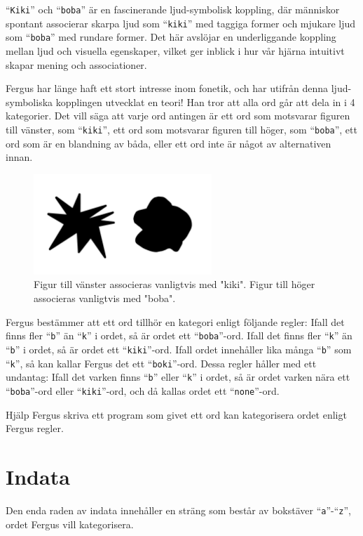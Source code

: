 \noindent
``\texttt{Kiki}'' och ``\texttt{boba}'' är en fascinerande ljud-symbolisk koppling, där människor spontant associerar skarpa ljud som ``\texttt{kiki}'' med taggiga former
och mjukare ljud som ``\texttt{boba}'' med rundare former. Det här avslöjar en underliggande koppling mellan ljud och visuella egenskaper, vilket ger inblick i hur
vår hjärna intuitivt skapar mening och associationer.

Fergus har länge haft ett stort intresse inom fonetik, och har utifrån denna ljud-symboliska kopplingen utvecklat en teori!
Han tror att alla ord går att dela in i 4 kategorier. Det vill säga att varje ord antingen är 
ett ord som motsvarar figuren till vänster, som ``\texttt{kiki}'', ett ord som motsvarar figuren till höger, som ``\texttt{boba}'', 
ett ord som är en blandning av båda, eller ett ord inte är något av alternativen innan.

\begin{figure}[h]
  \centering
\includegraphics[width=0.6\textwidth]{kikiboba.png}
  \caption{Figur till vänster associeras vanligtvis med "kiki". Figur till höger associeras vanligtvis med "boba".}
  \label{fig:kikiboba}
\end{figure}

Fergus bestämmer att ett ord tillhör en kategori enligt följande regler:
Ifall det finns fler ``\texttt{b}'' än ``\texttt{k}'' i ordet, så är ordet ett ``\texttt{boba}''-ord.
Ifall det finns fler ``\texttt{k}'' än ``\texttt{b}'' i ordet, så är ordet ett ``\texttt{kiki}''-ord. 
Ifall ordet innehåller lika många ``\texttt{b}'' som ``\texttt{k}'', så kan kallar Fergus det ett ``\texttt{boki}''-ord.
Dessa regler håller med ett undantag: 
Ifall det varken finns ``\texttt{b}'' eller ``\texttt{k}'' i ordet, så är ordet varken nära ett ``\texttt{boba}''-ord eller ``\texttt{kiki}''-ord, och då kallas ordet ett ``\texttt{none}''-ord.

Hjälp Fergus skriva ett program som givet ett ord kan kategorisera ordet enligt Fergus regler.

\section*{Indata}
Den enda raden av indata innehåller en sträng som består av bokstäver ``\texttt{a}''-``\texttt{z}'', ordet Fergus vill kategorisera.


